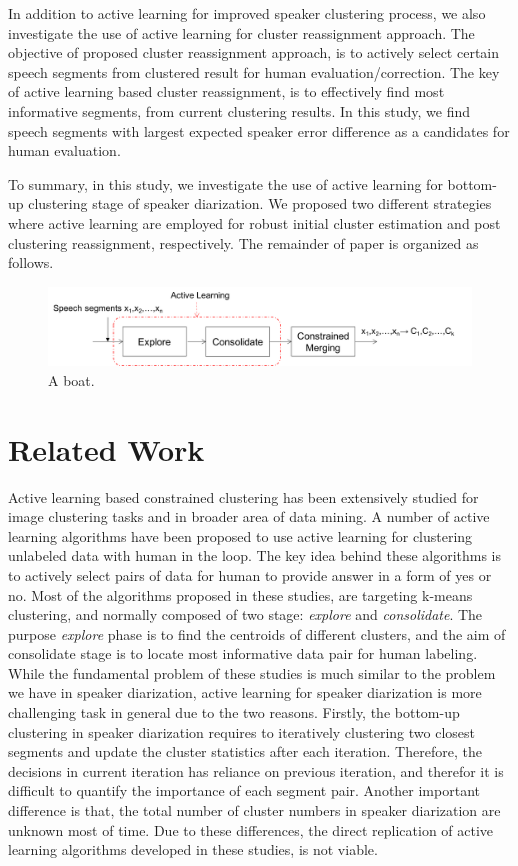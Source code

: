 \documentclass[journal]{IEEEtran}
\begin{document}
In addition to active learning for improved speaker clustering process, we also investigate the use of active learning for cluster reassignment approach. The objective of proposed cluster reassignment approach, is to actively select certain speech segments from clustered result for human evaluation/correction. The key of active learning based cluster reassignment, is to effectively find most informative segments, from current clustering results. In this study, we find speech segments with largest expected speaker error difference as a candidates for human evaluation.

To summary, in this study, we investigate the use of active learning for bottom-up clustering stage of speaker diarization. We proposed two different strategies where active learning are employed for robust initial cluster estimation and post clustering reassignment, respectively. The remainder of paper is organized as follows.   

\begin{figure}
	\includegraphics[width=\linewidth]{figs/flow3}
	\caption{A boat.}
	\label{fig:boat1}
\end{figure}

\section{Related Work}
Active learning based constrained clustering has been extensively studied for image clustering tasks and in broader area of data mining. A number of active learning algorithms have been proposed to use active learning for clustering unlabeled data with human in the loop. The key idea behind these algorithms is to actively select pairs of data for human to provide answer in a form of yes or no. 
Most of the algorithms proposed in these studies, are targeting k-means clustering, and normally composed of two stage: \textit{explore} and \textit{consolidate}. The purpose \textit{explore} phase is to find the centroids of different clusters, and the aim of consolidate stage is to locate most informative data pair for human labeling. While the fundamental problem of these studies is much similar to the problem we have in speaker diarization, active learning for speaker diarization is more challenging task in general due to the two reasons. Firstly, the bottom-up clustering in speaker diarization requires to iteratively clustering two closest segments and update the cluster statistics after each iteration. Therefore, the decisions in current iteration has reliance on previous iteration, and therefor it is difficult to quantify the importance of each segment pair. Another important difference is that, the total number of cluster numbers in speaker diarization are unknown most of time. Due to these differences, the direct replication of active learning algorithms developed in these studies, is not viable.
\end{document}
